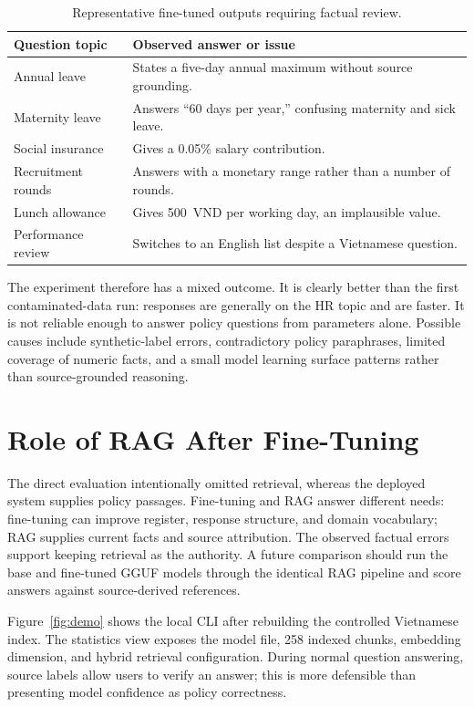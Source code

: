 \documentclass[12pt,a4paper,oneside]{report}
\begin{document}
\begin{table}[H]
\centering
\caption{Representative fine-tuned outputs requiring factual review.}
\label{tab:failure-examples}
\small
\begin{tabularx}{\textwidth}{@{}p{4.1cm}X@{}}
\toprule
\textbf{Question topic} & \textbf{Observed answer or issue} \\
\midrule
Annual leave & States a five-day annual maximum without source grounding. \\
Maternity leave & Answers ``60 days per year,'' confusing maternity and sick leave. \\
Social insurance & Gives a 0.05\% salary contribution. \\
Recruitment rounds & Answers with a monetary range rather than a number of rounds. \\
Lunch allowance & Gives 500~VND per working day, an implausible value. \\
Performance review & Switches to an English list despite a Vietnamese question. \\
\bottomrule
\end{tabularx}
\end{table}

The experiment therefore has a mixed outcome. It is clearly better than the
first contaminated-data run: responses are generally on the HR topic and are
faster. It is not reliable enough to answer policy questions from parameters
alone. Possible causes include synthetic-label errors, contradictory policy
paraphrases, limited coverage of numeric facts, and a small model learning
surface patterns rather than source-grounded reasoning.

\section{Role of RAG After Fine-Tuning}
The direct evaluation intentionally omitted retrieval, whereas the deployed
system supplies policy passages. Fine-tuning and RAG answer different needs:
fine-tuning can improve register, response structure, and domain vocabulary;
RAG supplies current facts and source attribution. The observed factual errors
support keeping retrieval as the authority. A future comparison should run the
base and fine-tuned GGUF models through the identical RAG pipeline and score
answers against source-derived references.

Figure~\ref{fig:demo} shows the local CLI after rebuilding the controlled
Vietnamese index. The statistics view exposes the model file, 258 indexed chunks,
embedding dimension, and hybrid retrieval configuration. During normal question
answering, source labels allow users to verify an answer; this is more defensible
than presenting model confidence as policy correctness.
\end{document}
